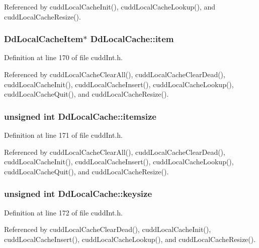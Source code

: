 Referenced by cudd\-Local\-Cache\-Init(), cudd\-Local\-Cache\-Lookup(), and cudd\-Local\-Cache\-Resize().
\subsubsection{\setlength{\rightskip}{0pt plus 5cm}\bf{Dd\-Local\-Cache\-Item}$\ast$ \bf{Dd\-Local\-Cache::item}}\label{structDdLocalCache_5b894c8287e08c2b3ff59ab7d208d2e4}




Definition at line 170 of file cudd\-Int.h.

Referenced by cudd\-Local\-Cache\-Clear\-All(), cudd\-Local\-Cache\-Clear\-Dead(), cudd\-Local\-Cache\-Init(), cudd\-Local\-Cache\-Insert(), cudd\-Local\-Cache\-Lookup(), cudd\-Local\-Cache\-Quit(), and cudd\-Local\-Cache\-Resize().
\subsubsection{\setlength{\rightskip}{0pt plus 5cm}unsigned int \bf{Dd\-Local\-Cache::itemsize}}\label{structDdLocalCache_37fb6f0ae8dda9e85c9422c75409045d}




Definition at line 171 of file cudd\-Int.h.

Referenced by cudd\-Local\-Cache\-Clear\-All(), cudd\-Local\-Cache\-Clear\-Dead(), cudd\-Local\-Cache\-Init(), cudd\-Local\-Cache\-Insert(), cudd\-Local\-Cache\-Lookup(), cudd\-Local\-Cache\-Quit(), and cudd\-Local\-Cache\-Resize().
\subsubsection{\setlength{\rightskip}{0pt plus 5cm}unsigned int \bf{Dd\-Local\-Cache::keysize}}\label{structDdLocalCache_e19bf1b91307141a9cf0c2e43dadb033}




Definition at line 172 of file cudd\-Int.h.

Referenced by cudd\-Local\-Cache\-Clear\-Dead(), cudd\-Local\-Cache\-Init(), cudd\-Local\-Cache\-Insert(), cudd\-Local\-Cache\-Lookup(), and cudd\-Local\-Cache\-Resize().
